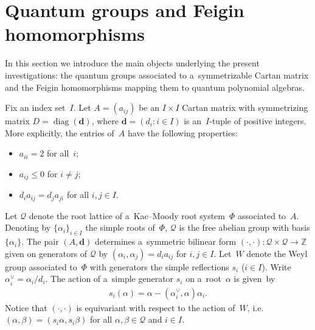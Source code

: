 \documentclass[pdftex]{sigma}
\numberwithin{equation}{section}
\begin{document}
\section{Quantum groups and Feigin homomorphisms}\label{sec:feigin}

In this section we introduce the main objects underlying the present investigations: the quantum groups associated to
a~symmetrizable Cartan matrix and the Feigin homomorphisms mapping them to quantum polynomial algebras.

Fix an index set~$I$.
Let $A=(a_{ij})$ be an $I\times I$ Cartan matrix with symmetrizing matrix $D=\operatorname{diag}(\mathbf{d})$, where
$\mathbf{d}=(d_i: i\in I)$ is an~$I$-tuple of positive integers.
More explicitly, the entries of~$A$ have the following properties:
\begin{itemize}\itemsep=0pt
\item $a_{ii}=2$ for all~$i$;
\item $a_{ij}\le0$ for $i\ne j$;
\item $d_ia_{ij}=d_ja_{ji}$ for all $i,j\in I$.
\end{itemize}
Let $\mathcal{Q}$ denote the root lattice of a~Kac--Moody root system~$\Phi$ associated to~$A$.
Denoting by $\{\alpha_i\}_{i\in I}$ the simple roots of~$\Phi$, $\mathcal{Q}$ is the free abelian %
group with basis $\{\alpha_i\}$.
The pair $(A,\mathbf{d})$ determines a~symmetric bilinear form $(\cdot,\cdot):\mathcal{Q}\times\mathcal{Q}\to\mathbb{Z}$
given on generators of $\mathcal{Q}$ by $(\alpha_i,\alpha_j)=d_ia_{ij}$ for $i,j\in I$.
Let~$W$ denote the Weyl group associated to~$\Phi$ with generators the simple ref\/lections $s_i$ ($i\in I$).
Write $\alpha_i^\vee=\alpha_i/d_i$.
The action of a~simple generator $s_i$ on a~root~$\alpha$ is given~by
\begin{gather*}
s_i(\alpha)=\alpha-(\alpha_i^\vee,\alpha)\alpha_i.
\end{gather*}
Notice that $(\cdot,\cdot)$ is equivariant with respect to the action of~$W$, i.e.~$(\alpha,\beta)=(s_i\alpha,s_i\beta)$
for all $\alpha,\beta\in\mathcal{Q}$ and $i\in I$.
\end{document}
